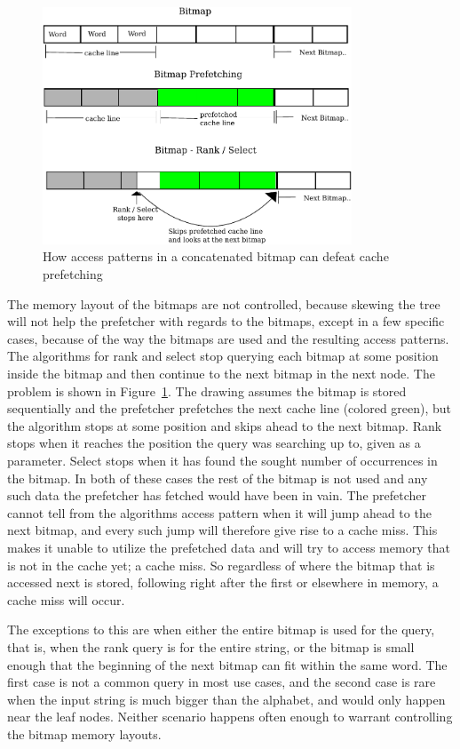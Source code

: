 \begin{figure}\tiny\center
\includegraphics[width=0.82\textwidth]{QueryPrefetchFigure.pdf}
\caption{How access patterns in a concatenated bitmap can defeat cache prefetching}
\label{fig:QueryPrefetchFigure}
\end{figure}

The memory layout of the bitmaps are not controlled, because skewing the tree will not help the prefetcher with regards to the bitmaps, except in a few specific cases, because of the way the bitmaps are used and the resulting access patterns.
The algorithms for rank and select stop querying each bitmap at some position inside the bitmap and then continue to the next bitmap in the next node.
The problem is shown in Figure~\ref{fig:QueryPrefetchFigure}. The drawing assumes the bitmap is stored sequentially and the prefetcher prefetches the next cache line (colored green), but the algorithm stops at some position and skips ahead to the next bitmap. 
Rank stops when it reaches the position the query was searching up to, given as a parameter.
Select stops when it has found the sought number of occurrences in the bitmap.
In both of these cases the rest of the bitmap is not used and any such data the prefetcher has fetched would have been in vain.
The prefetcher cannot tell from the algorithms access pattern when it will jump ahead to the next bitmap, and every such jump will therefore give rise to a cache miss.
This makes it unable to utilize the prefetched data and will try to access memory that is not in the cache yet; a cache miss.
So regardless of where the bitmap that is accessed next is stored, following right after the first or elsewhere in memory, a cache miss will occur.

The exceptions to this are when either the entire bitmap is used for the query, that is, when the rank query is for the entire string, or the bitmap is small enough that the beginning of the next bitmap can fit within the same word.
The first case is not a common query in most use cases, and the second case is rare when the input string is much bigger than the alphabet, and would only happen near the leaf nodes.
Neither scenario happens often enough to warrant controlling the bitmap memory layouts.





